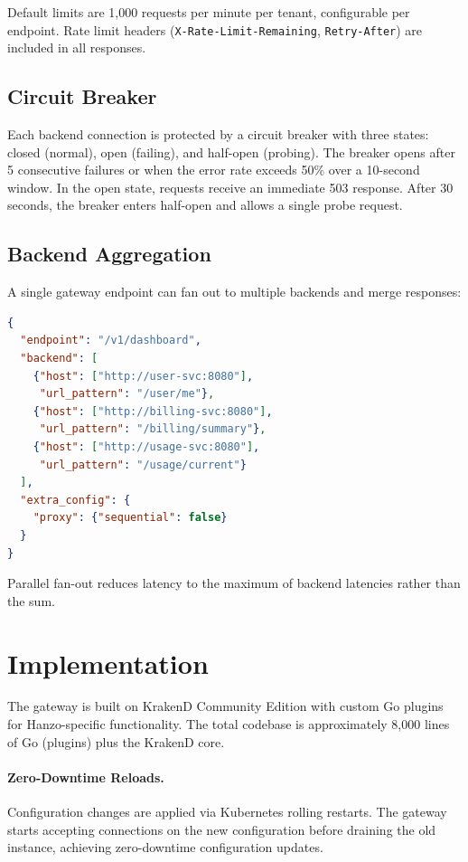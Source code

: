 \documentclass[11pt,twocolumn]{article}
\begin{document}
Default limits are 1,000 requests per minute per tenant, configurable per endpoint. Rate limit headers (\texttt{X-Rate-Limit-Remaining}, \texttt{Retry-After}) are included in all responses.

\subsection{Circuit Breaker}

Each backend connection is protected by a circuit breaker with three states: closed (normal), open (failing), and half-open (probing). The breaker opens after 5 consecutive failures or when the error rate exceeds 50\% over a 10-second window. In the open state, requests receive an immediate 503 response. After 30 seconds, the breaker enters half-open and allows a single probe request.

\subsection{Backend Aggregation}

A single gateway endpoint can fan out to multiple backends and merge responses:

\begin{lstlisting}[language=JSON]
{
  "endpoint": "/v1/dashboard",
  "backend": [
    {"host": ["http://user-svc:8080"],
     "url_pattern": "/user/me"},
    {"host": ["http://billing-svc:8080"],
     "url_pattern": "/billing/summary"},
    {"host": ["http://usage-svc:8080"],
     "url_pattern": "/usage/current"}
  ],
  "extra_config": {
    "proxy": {"sequential": false}
  }
}
\end{lstlisting}

Parallel fan-out reduces latency to the maximum of backend latencies rather than the sum.

\section{Implementation}

The gateway is built on KrakenD Community Edition with custom Go plugins for Hanzo-specific functionality. The total codebase is approximately 8,000 lines of Go (plugins) plus the KrakenD core.

\paragraph{Zero-Downtime Reloads.} Configuration changes are applied via Kubernetes rolling restarts. The gateway starts accepting connections on the new configuration before draining the old instance, achieving zero-downtime configuration updates.
\end{document}

